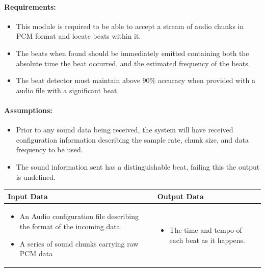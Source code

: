 \documentclass[english,12pt]{scrartcl}
\begin{document}
		\paragraph{Requirements:}
		\begin{itemize}
			\item This module is required to be able to accept a stream of audio chunks in PCM format and locate beats within it.
			\item The beats when found should be immediately emitted containing both the absolute time the beat occurred, and the estimated frequency of the beats.
			\item The beat detector must maintain above 90\% accuracy when provided with a audio file with a significant beat.
		\end{itemize}
		
		\paragraph{Assumptions:}
		\begin{itemize}
			\item Prior to any sound data being received, the system will have received configuration information describing the sample rate, chunk size, and data frequency to be used.
			\item The sound information sent has a distinguishable beat, failing this the output is undefined.
		\end{itemize}
		
		\begin{tabular}{p{7cm}|p{7cm}}
    			\textbf{Input Data} & \textbf{Output Data} \\ \hline
			\begin{itemize}
				\item An Audio configuration file describing the format of the incoming data.
				\item A series of sound chunks carrying raw PCM data
			\end{itemize}
			&
			\begin{itemize}
				\item The time and tempo of each beat as it happens.
			\end{itemize}
		\end{tabular}
		
\end{document}
